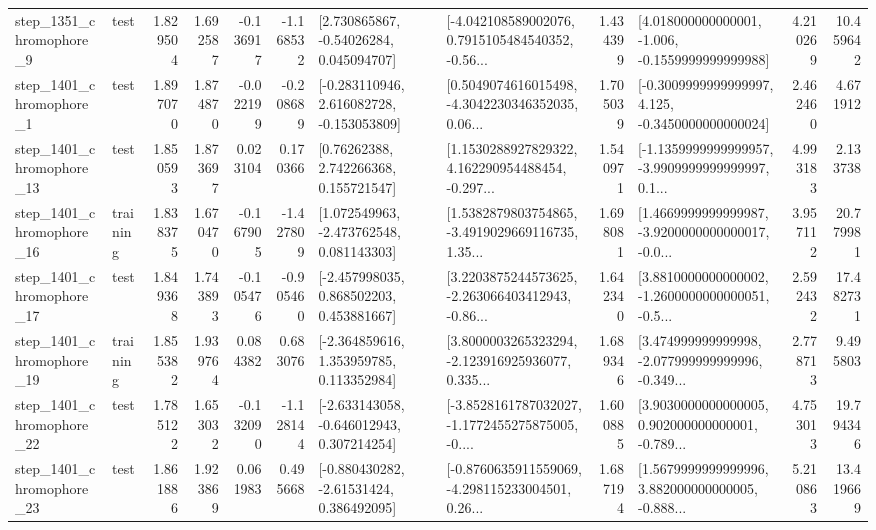 \begin{tabular}{llrrrrllrlrr}
  step\_1351\_chromophore\_9 &      test &      1.829504 &    1.692587 &     -0.136917 & -1.168532 &     [2.730865867, -0.54026284, 0.045094707] &  [-4.042108589002076, 0.7915105484540352, -0.56... &       1.434399 &   [4.018000000000001, -1.006, -0.1559999999999988] &            4.210269 &         10.459642 \\
  step\_1401\_chromophore\_1 &      test &      1.897070 &    1.874870 &     -0.022199 & -0.208689 &   [-0.283110946, 2.616082728, -0.153053809] &  [0.5049074616015498, -4.3042230346352035, 0.06... &       1.705039 &  [-0.3009999999999997, 4.125, -0.3450000000000024] &            2.462460 &          4.671912 \\
 step\_1401\_chromophore\_13 &      test &      1.850593 &    1.873697 &      0.023104 &  0.170366 &      [0.76262388, 2.742266368, 0.155721547] &  [1.1530288927829322, 4.162290954488454, -0.297... &       1.540971 &  [-1.1359999999999957, -3.9909999999999997, 0.1... &            4.993183 &          2.133738 \\
 step\_1401\_chromophore\_16 &  training &      1.838375 &    1.670470 &     -0.167905 & -1.427809 &    [1.072549963, -2.473762548, 0.081143303] &  [1.5382879803754865, -3.4919029669116735, 1.35... &       1.698081 &  [1.4669999999999987, -3.9200000000000017, -0.0... &            3.957112 &         20.779981 \\
 step\_1401\_chromophore\_17 &      test &      1.849368 &    1.743893 &     -0.105476 & -0.905460 &    [-2.457998035, 0.868502203, 0.453881667] &  [3.2203875244573625, -2.263066403412943, -0.86... &       1.642340 &  [3.8810000000000002, -1.2600000000000051, -0.5... &            2.592432 &         17.482731 \\
 step\_1401\_chromophore\_19 &  training &      1.855382 &    1.939764 &      0.084382 &  0.683076 &    [-2.364859616, 1.353959785, 0.113352984] &  [3.8000003265323294, -2.123916925936077, 0.335... &       1.689346 &  [3.474999999999998, -2.077999999999996, -0.349... &            2.778713 &          9.495803 \\
 step\_1401\_chromophore\_22 &      test &      1.785122 &    1.653032 &     -0.132090 & -1.128144 &   [-2.633143058, -0.646012943, 0.307214254] &  [-3.8528161787032027, -1.1772455275875005, -0.... &       1.600885 &  [3.9030000000000005, 0.902000000000001, -0.789... &            4.753013 &         19.794346 \\
 step\_1401\_chromophore\_23 &      test &      1.861886 &    1.923869 &      0.061983 &  0.495668 &    [-0.880430282, -2.61531424, 0.386492095] &  [-0.8760635911559069, -4.298115233004501, 0.26... &       1.687194 &  [1.5679999999999996, 3.882000000000005, -0.888... &            5.210863 &         13.419669 \\

\end{tabular}
